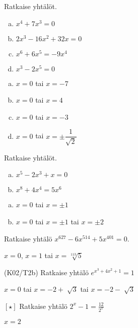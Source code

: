 \begin{tehtava}
    Ratkaise yhtälöt.
    \begin{enumerate}[a)]
        \item $x^4 + 7x^3 = 0$
        \item $2x^3 - 16x^2 + 32x = 0$
        \item $x^6 + 6x^5 = -9x^4$
        \item $x^3 - 2x^5 = 0$      
    \end{enumerate}
    \begin{vastaus}
        \begin{enumerate}[a)]
        	\item $x = 0$ tai $x = -7$
        	\item $x = 0$ tai $x = 4$
        	\item $x = 0$ tai $x = -3$
            \item $x = 0$ tai $x = \pm\dfrac{1}{\sqrt{2}}$
        \end{enumerate}
    \end{vastaus}
\end{tehtava}

\begin{tehtava}
    Ratkaise yhtälöt.
    \begin{enumerate}[a)]
        \item $x^5 - 2x^3 + x = 0$
        \item $x^8 + 4x^4 = 5x^6$       
    \end{enumerate}
    \begin{vastaus}
        \begin{enumerate}[a)]
        	\item $x = 0$ tai $x = \pm1$
        	\item $x = 0$ tai $x = \pm1$ tai $x = \pm2$
        \end{enumerate}
    \end{vastaus}
\end{tehtava}

\begin{tehtava}
	Ratkaise yhtälö $x^{627} - 6x^{514} + 5x^{401} = 0$.
	\begin{vastaus}
		$x = 0$, $x = 1$ tai $x = \sqrt[113]{5}$
	\end{vastaus}
\end{tehtava}

\begin{tehtava}
	(K02/T2b) Ratkaise yhtälö $e^{x^3+4x^2+1}=1$
	\begin{vastaus}
	$x=0$ tai $x=-2 + \sqrt[]{3}$ tai $x=-2 - \sqrt[]{3}$
	\end{vastaus}
\end{tehtava}

\begin{tehtava}
	$[ \star ]$ Ratkaise yhtälö $2^x-1=\frac{12}{2^x}$
	\begin{vastaus}
	$x=2$
	\end{vastaus}
\end{tehtava}